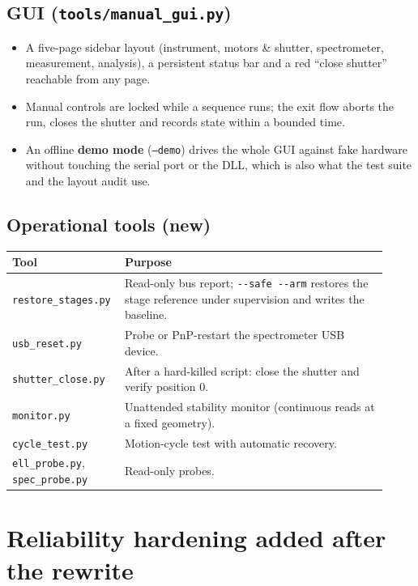\documentclass[11pt]{article}
\newcommand{\code}[1]{\texttt{\small #1}}
\begin{document}
\subsection{GUI (\code{tools/manual\_gui.py})}
\begin{itemize}
\item A five-page sidebar layout (instrument, motors \& shutter, spectrometer, measurement,
analysis), a persistent status bar and a red ``close shutter'' reachable from any page.
\item Manual controls are locked while a sequence runs; the exit flow aborts the run, closes the
shutter and records state within a bounded time.
\item An offline \textbf{demo mode} (\code{--demo}) drives the whole GUI against fake hardware without
touching the serial port or the DLL, which is also what the test suite and the layout audit use.
\end{itemize}

\subsection{Operational tools (new)}
\begin{center}
\begin{tabular}{>{\raggedright\arraybackslash}p{0.24\linewidth} >{\raggedright\arraybackslash}p{0.68\linewidth}}
\toprule
\textbf{Tool} & \textbf{Purpose} \\
\midrule
\code{restore\_stages.py} & Read-only bus report; \code{-{}-safe -{}-arm} restores the stage
reference under supervision and writes the baseline. \\
\code{usb\_reset.py} & Probe or PnP-restart the spectrometer USB device. \\
\code{shutter\_close.py} & After a hard-killed script: close the shutter and verify position 0. \\
\code{monitor.py} & Unattended stability monitor (continuous reads at a fixed geometry). \\
\code{cycle\_test.py} & Motion-cycle test with automatic recovery. \\
\code{ell\_probe.py}, \code{spec\_probe.py} & Read-only probes. \\
\bottomrule
\end{tabular}
\end{center}

\section{Reliability hardening added after the rewrite}
\end{document}
